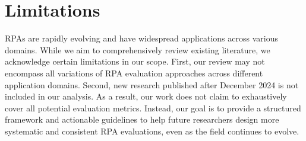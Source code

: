 \section*{Limitations}

RPAs are rapidly evolving and have widespread applications across various domains. While we aim to comprehensively review existing literature, we acknowledge certain limitations in our scope.
First, our review may not encompass all variations of RPA evaluation approaches across different application domains. Second, new research published after December 2024 is not included in our analysis. As a result, our work does not claim to exhaustively cover all potential evaluation metrics. Instead, our goal is to provide a structured framework and actionable guidelines to help future researchers design more systematic and consistent RPA evaluations, even as the field continues to evolve.




